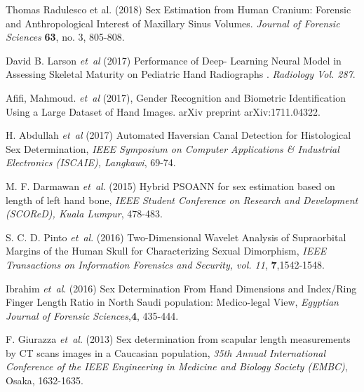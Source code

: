\documentclass{bioinfo}
\begin{document}
%
%
%
%
%
%
%
%
%


\begin{thebibliography}{}
Thomas Radulesco et al. (2018) Sex Estimation from Human Cranium: Forensic and Anthropological Interest of Maxillary Sinus Volumes. {\it Journal of Forensic Sciences} {\bf 63}, no. 3, 805-808.


David B. Larson {\it et~al} (2017) Performance of Deep- Learning  Neural   Model in Assessing Skeletal Maturity on Pediatric Hand Radiographs . {\it Radiology Vol. 287}.

Afifi, Mahmoud. {\it et~al} (2017), Gender Recognition and Biometric Identification Using a Large Dataset of Hand Images. arXiv preprint arXiv:1711.04322.

H. Abdullah {\it et~al} (2017)  Automated Haversian Canal Detection for Histological Sex Determination, {\it IEEE Symposium on Computer Applications \& Industrial Electronics (ISCAIE), Langkawi}, 69-74.

 M. F. Darmawan {\it et~al}. (2015) Hybrid PSOANN for sex estimation based on length of left hand bone, {\it IEEE Student Conference on Research and Development (SCOReD), Kuala Lumpur}, 478-483.
 
 S. C. D. Pinto {\it et~al}. (2016) Two-Dimensional Wavelet Analysis of Supraorbital Margins of the Human Skull for Characterizing Sexual Dimorphism, {\it IEEE Transactions on Information Forensics and Security, vol. 11}, {\bf 7},1542-1548.
 
Ibrahim {\it et~al}. (2016) Sex Determination From Hand Dimensions and Index/Ring Finger Length Ratio in North Saudi population: Medico-legal View, {\it Egyptian Journal of Forensic Sciences},{\bf 4}, 435-444.

 F. Giurazza {\it et~al}. (2013) Sex determination from scapular length measurements by CT scans images in a Caucasian population, {\it 35th Annual International Conference of the IEEE Engineering in Medicine and Biology Society (EMBC)}, Osaka, 1632-1635.
 

\end{thebibliography}
\end{document}
